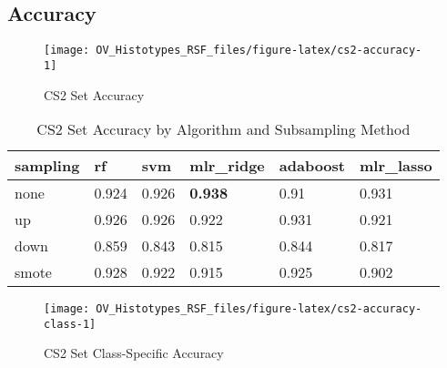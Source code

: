 \documentclass[
]{report}
\begin{document}
\hypertarget{accuracy-3}{%
\subsection{Accuracy}\label{accuracy-3}}

\begin{figure}[H]

{\centering \texttt{[image: OV\_Histotypes\_RSF\_files/figure-latex/cs2-accuracy-1]} 

}

\caption{CS2 Set Accuracy}\label{fig:cs2-accuracy}
\end{figure}

\begin{table}

\caption{\label{tab:cs2-accuracy-table}CS2 Set Accuracy by Algorithm and Subsampling Method}
\centering
\begin{tabular}[t]{l|l|l|l|l|l}
\hline
sampling & rf & svm & mlr\_ridge & adaboost & mlr\_lasso\\
\hline
none & 0.924 & 0.926 & \textbf{0.938} & 0.91 & 0.931\\
\hline
up & 0.926 & 0.926 & 0.922 & 0.931 & 0.921\\
\hline
down & 0.859 & 0.843 & 0.815 & 0.844 & 0.817\\
\hline
smote & 0.928 & 0.922 & 0.915 & 0.925 & 0.902\\
\hline
\end{tabular}
\end{table}

\begin{figure}[H]

{\centering \texttt{[image: OV\_Histotypes\_RSF\_files/figure-latex/cs2-accuracy-class-1]} 

}

\caption{CS2 Set Class-Specific Accuracy}\label{fig:cs2-accuracy-class}
\end{figure}
\end{document}
